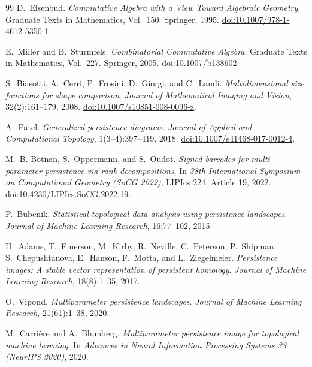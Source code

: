 \documentclass[11pt]{article}
\theoremstyle{definition}
\theoremstyle{remark}
\begin{document}
\begin{thebibliography}{99}
D.~Eisenbud.
\newblock \emph{Commutative Algebra with a View Toward Algebraic Geometry}.
\newblock Graduate Texts in Mathematics, Vol.~150. Springer, 1995.
\newblock \href{https://doi.org/10.1007/978-1-4612-5350-1}{doi:10.1007/978-1-4612-5350-1}.

E.~Miller and B.~Sturmfels.
\newblock \emph{Combinatorial Commutative Algebra}.
\newblock Graduate Texts in Mathematics, Vol.~227. Springer, 2005.
\newblock \href{https://doi.org/10.1007/b138602}{doi:10.1007/b138602}.

S.~Biasotti, A.~Cerri, P.~Frosini, D.~Giorgi, and C.~Landi.
\newblock \emph{Multidimensional size functions for shape comparison}.
\newblock \emph{Journal of Mathematical Imaging and Vision}, 32(2):161--179, 2008.
\newblock \href{https://doi.org/10.1007/s10851-008-0096-z}{doi:10.1007/s10851-008-0096-z}.

A.~Patel.
\newblock \emph{Generalized persistence diagrams}.
\newblock \emph{Journal of Applied and Computational Topology}, 1(3--4):397--419, 2018.
\newblock \href{https://doi.org/10.1007/s41468-017-0012-4}{doi:10.1007/s41468-017-0012-4}.

M.~B. Botnan, S.~Oppermann, and S.~Oudot.
\newblock \emph{Signed barcodes for multi-parameter persistence via rank decompositions}.
\newblock In \emph{38th International Symposium on Computational Geometry (SoCG 2022)}, LIPIcs 224, Article 19, 2022.
\newblock \href{https://doi.org/10.4230/LIPIcs.SoCG.2022.19}{doi:10.4230/LIPIcs.SoCG.2022.19}.

P.~Bubenik.
\newblock \emph{Statistical topological data analysis using persistence landscapes}.
\newblock \emph{Journal of Machine Learning Research}, 16:77--102, 2015.

H.~Adams, T.~Emerson, M.~Kirby, R.~Neville, C.~Peterson, P.~Shipman, S.~Chepushtanova, E.~Hanson, F.~Motta, and L.~Ziegelmeier.
\newblock \emph{Persistence images: A stable vector representation of persistent homology}.
\newblock \emph{Journal of Machine Learning Research}, 18(8):1--35, 2017.

O.~Vipond.
\newblock \emph{Multiparameter persistence landscapes}.
\newblock \emph{Journal of Machine Learning Research}, 21(61):1--38, 2020.

M.~Carri\`ere and A.~Blumberg.
\newblock \emph{Multiparameter persistence image for topological machine learning}.
\newblock In \emph{Advances in Neural Information Processing Systems 33 (NeurIPS 2020)}, 2020.


\end{thebibliography}
\end{document}
